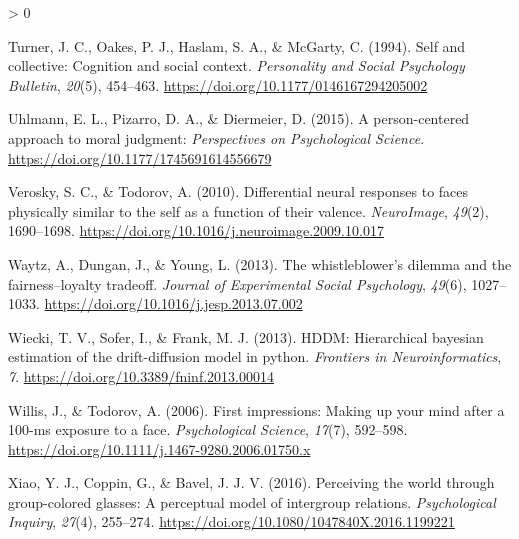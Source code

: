 \documentclass[
  english,
  man]{apa6}
\newlength{\cslhangindent}
\newenvironment{CSLReferences}[2] %
 {%
  \setlength{\parindent}{0pt}
  \ifodd #1 \everypar{\setlength{\hangindent}{\cslhangindent}}\ignorespaces\fi
  \ifnum #2 > 0
  \setlength{\parskip}{#2\baselineskip}
  \fi
 }%
 {}
\begin{document}
\begin{CSLReferences}{1}{0}
\leavevmode\hypertarget{ref-turner_self_1994}{}%
Turner, J. C., Oakes, P. J., Haslam, S. A., \& McGarty, C. (1994). Self and collective: Cognition and social context. \emph{Personality and Social Psychology Bulletin}, \emph{20}(5), 454--463. \url{https://doi.org/10.1177/0146167294205002}

\leavevmode\hypertarget{ref-uhlmann_person-centered_2015}{}%
Uhlmann, E. L., Pizarro, D. A., \& Diermeier, D. (2015). A person-centered approach to moral judgment: \emph{Perspectives on Psychological Science}. \url{https://doi.org/10.1177/1745691614556679}

\leavevmode\hypertarget{ref-verosky_differential_2010}{}%
Verosky, S. C., \& Todorov, A. (2010). Differential neural responses to faces physically similar to the self as a function of their valence. \emph{{NeuroImage}}, \emph{49}(2), 1690--1698. \url{https://doi.org/10.1016/j.neuroimage.2009.10.017}

\leavevmode\hypertarget{ref-waytz_whistleblowers_2013}{}%
Waytz, A., Dungan, J., \& Young, L. (2013). The whistleblower's dilemma and the fairness--loyalty tradeoff. \emph{Journal of Experimental Social Psychology}, \emph{49}(6), 1027--1033. \url{https://doi.org/10.1016/j.jesp.2013.07.002}

\leavevmode\hypertarget{ref-wiecki_hddm_2013}{}%
Wiecki, T. V., Sofer, I., \& Frank, M. J. (2013). {HDDM}: Hierarchical bayesian estimation of the drift-diffusion model in python. \emph{Frontiers in Neuroinformatics}, \emph{7}. \url{https://doi.org/10.3389/fninf.2013.00014}

\leavevmode\hypertarget{ref-willis_first_2006}{}%
Willis, J., \& Todorov, A. (2006). First impressions: Making up your mind after a 100-ms exposure to a face. \emph{Psychological Science}, \emph{17}(7), 592--598. \url{https://doi.org/10.1111/j.1467-9280.2006.01750.x}

\leavevmode\hypertarget{ref-xiao_perceiving_2016}{}%
Xiao, Y. J., Coppin, G., \& Bavel, J. J. V. (2016). Perceiving the world through group-colored glasses: A perceptual model of intergroup relations. \emph{Psychological Inquiry}, \emph{27}(4), 255--274. \url{https://doi.org/10.1080/1047840X.2016.1199221}

\end{CSLReferences}

\endgroup
\end{document}
